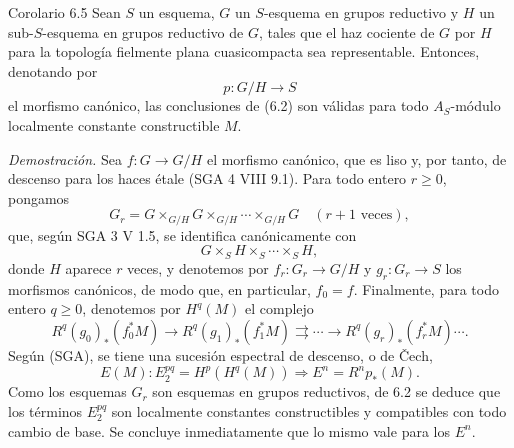 \begin{statement}{Corolario 6.5}
Sean $S$ un esquema, $G$ un $S$-esquema en grupos reductivo y $H$ un sub-$S$-esquema en grupos reductivo de $G$, tales que el haz cociente de $G$ por $H$ para la topología fielmente plana cuasicompacta sea representable. Entonces, denotando por
\[
p:G/H\to S
\]
el morfismo canónico, las conclusiones de (6.2) son válidas para todo $A_S$-módulo localmente constante constructible $M$.
\end{statement}

\emph{Demostración.} Sea $f:G\to G/H$ el morfismo canónico, que es liso y, por tanto, de descenso para los haces étale (SGA 4 VIII 9.1). Para todo entero $r\ge0$, pongamos
\[
G_r=G\times_{G/H}G\times_{G/H}\cdots\times_{G/H}G
\quad(r+1\text{ veces}),
\]
que, según SGA 3 V 1.5, se identifica canónicamente con
\[
G\times_S H\times_S\cdots\times_S H,
\]
donde $H$ aparece $r$ veces, y denotemos por $f_r:G_r\to G/H$ y $g_r:G_r\to S$ los morfismos canónicos, de modo que, en particular, $f_0=f$. Finalmente, para todo entero $q\ge0$, denotemos por $H^q(M)$ el complejo
\[
R^q(g_0)_*(f_0^*M)\to R^q(g_1)_*(f_1^*M)\rightrightarrows\cdots\to R^q(g_r)_*(f_r^*M)\cdots .
\]
Según (SGA), se tiene una sucesión espectral de descenso, o de Čech,
\[
E(M):E_2^{pq}=H^p(H^q(M))\Rightarrow E^n=R^np_*(M).
\]
Como los esquemas $G_r$ son esquemas en grupos reductivos, de 6.2 se deduce que los términos $E_2^{pq}$ son localmente constantes constructibles y compatibles con todo cambio de base. Se concluye inmediatamente que lo mismo vale para los $E^n$.
